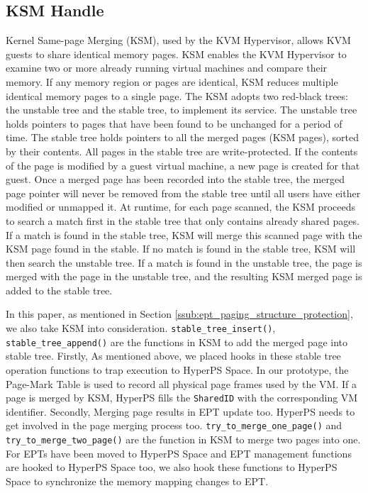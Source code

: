 \subsection{KSM Handle}%
\label{sub:ksm_handle}
Kernel Same-page Merging (KSM), used by the KVM Hypervisor, allows KVM guests to share identical memory pages. 
KSM enables the KVM Hypervisor to examine two or more already running virtual machines and compare their memory. If any memory region or pages are identical, KSM reduces multiple identical memory pages to a single page. 
The KSM adopts two red-black trees: the unstable tree and the stable tree, to implement its service.
The unstable tree holds pointers to pages that have been found to be unchanged for a period of time. 
The stable tree holds pointers to all the merged pages (KSM pages), sorted by their contents. All pages in the stable tree are write-protected. 
If the contents of the page is modified by a guest virtual machine, a new page is created for that guest.
Once a merged page has been recorded into the stable tree, the merged page pointer will never be removed from the stable tree until all users have either modified or unmapped it. 
At runtime, for each page scanned, the KSM proceeds to search a match first in the stable tree that only contains already shared pages. If a match is found in the stable tree, KSM will merge this scanned page with the KSM page found in the stable. 
If no match is found in the stable tree, KSM will then search the unstable tree. If a match is found in the unstable tree, the page is merged with the page in the unstable tree, and the resulting KSM merged page is added to the stable tree. 

In this paper, as mentioned in Section \ref{ssub:ept_paging_structure_protection}, we also take KSM into consideration. 
\verb|stable_tree_insert()|, \verb|stable_tree_append()| are the functions in KSM to add the merged page into stable tree. 
Firstly, As mentioned above, we placed hooks in these stable tree operation functions to trap execution to HyperPS Space. 
In our prototype, the Page-Mark Table is used to record all physical page frames used by the VM. If a page is merged by KSM, HyperPS fills the \verb|SharedID| with the corresponding VM identifier. 
Secondly, Merging page results in EPT update too. HyperPS needs to get involved in the page merging process too. 
\verb|try_to_merge_one_page()| and \verb|try_to_merge_two_page()| are the function in KSM to merge two pages into one. 
For EPTs have been moved to HyperPS Space and EPT management functions are hooked to HyperPS Space too, we also hook these functions to HyperPS Space to synchronize the memory mapping changes to EPT.


